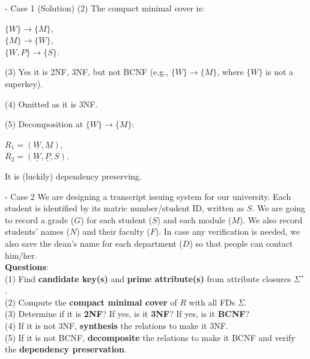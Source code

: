 \begin{frame}[fragile]{ - Case 1 (Solution)}
	(2) The compact minimal cover is:\\\vspace{5pt}
	
	$\{W\} \rightarrow \{M\},$\\
	$\{M\}  \rightarrow \{W\},$\\
	$\{W, P\} \rightarrow \{S\}.$\\\vspace{5pt}
	
	(3)  Yes it is 2NF, 3NF, but not BCNF (e.g., $\{W\} \rightarrow \{M\}$, where $\{W\}$ is not a superkey).\\\vspace{5pt}
	
	(4) Omitted as it is 3NF. \\\vspace{5pt}
	
	(5) Decomposition at $\{W\} \rightarrow \{M\}$:\\\vspace{5pt}
	
	$R_1 = (\underline{W}, \underline{M}),$\\
	$R_2 = (\underline{W}, \underline{P}, S).$\\\vspace{5pt}
	
	It is (luckily) dependency preserving.
	
\end{frame}

\begin{frame}[fragile]{ - Case 2}
	We are designing a transcript issuing system for our university. 
	Each student is identified by its matric number/student ID, written as $S$.
	We are going to record a grade ($G$) for each student ($S$) and each module ($M$).
	We also record students' names ($N$) and their faculty ($F$). In case any verification is needed, we also save the dean's name for each department ($D$) so that people can contact him/her.\\\vspace{10pt}
	\textbf{Questions}:\\
	(1) Find \textbf{candidate key(s)} and \textbf{prime attribute(s)} from attribute closures $\Sigma^{+}$.\\
	(2) Compute the \textbf{compact minimal cover} of $R$ with all FDs $\Sigma$.\\
	(3) Determine if it is \textbf{2NF}? If yes, is it \textbf{3NF}? If yes, is it \textbf{BCNF}?\\
	(4) If it is not 3NF, \textbf{synthesis} the relations to make it 3NF.\\
	(5) If it is not BCNF, \textbf{decomposite} the relations to make it BCNF and verify the \textbf{dependency preservation}. 
\end{frame}

